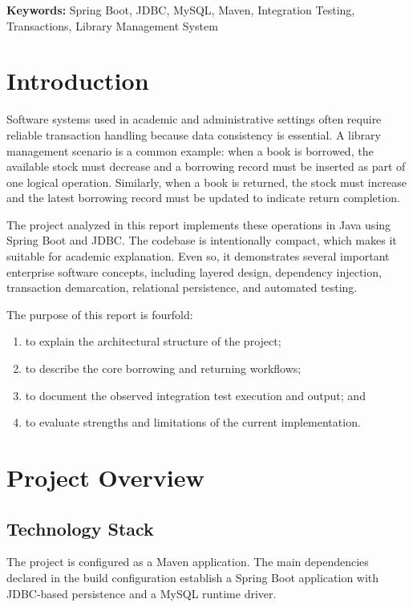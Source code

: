 \documentclass[12pt,a4paper]{report}
\begin{document}
\textbf{Keywords:} Spring Boot, JDBC, MySQL, Maven, Integration Testing, Transactions, Library Management System

\clearpage
{}

\chapter{Introduction}
Software systems used in academic and administrative settings often require reliable transaction handling because data consistency is essential. A library management scenario is a common example: when a book is borrowed, the available stock must decrease and a borrowing record must be inserted as part of one logical operation. Similarly, when a book is returned, the stock must increase and the latest borrowing record must be updated to indicate return completion.

The project analyzed in this report implements these operations in Java using Spring Boot and JDBC. The codebase is intentionally compact, which makes it suitable for academic explanation. Even so, it demonstrates several important enterprise software concepts, including layered design, dependency injection, transaction demarcation, relational persistence, and automated testing.

The purpose of this report is fourfold:
\begin{enumerate}
    \item to explain the architectural structure of the project;
    \item to describe the core borrowing and returning workflows;
    \item to document the observed integration test execution and output; and
    \item to evaluate strengths and limitations of the current implementation.
\end{enumerate}

\chapter{Project Overview}

\section{Technology Stack}
The project is configured as a Maven application. The main dependencies declared in the build configuration establish a Spring Boot application with JDBC-based persistence and a MySQL runtime driver.
\end{document}
